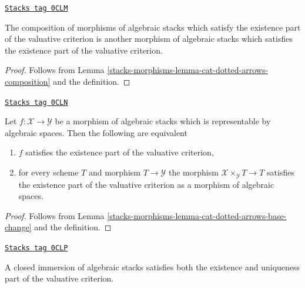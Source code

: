 \begin{lemma}
\label{stacks-morphisms-lemma-composition-existence}
\href{https://stacks.math.columbia.edu/tag/0CLM}{\texttt{Stacks tag 0CLM}}

The composition of morphisms of algebraic stacks which satisfy the
existence part of the valuative criterion is another
morphism of algebraic stacks which satisfies the
existence part of the valuative criterion.
\end{lemma}

\begin{proof}
Follows from Lemma \ref{stacks-morphisms-lemma-cat-dotted-arrows-composition}
and the definition.
\end{proof}

\begin{lemma}
\label{stacks-morphisms-lemma-existence-representable}
\href{https://stacks.math.columbia.edu/tag/0CLN}{\texttt{Stacks tag 0CLN}}

Let $f : \mathcal{X} \to \mathcal{Y}$ be a morphism of algebraic stacks
which is representable by algebraic spaces. Then the following are equivalent
\begin{enumerate}
\item $f$ satisfies the existence part of the valuative criterion,
\item for every scheme $T$ and morphism $T \to \mathcal{Y}$
the morphism $\mathcal{X} \times_\mathcal{Y} T \to T$ satisfies
the existence part of the valuative criterion as a morphism
of algebraic spaces.
\end{enumerate}
\end{lemma}

\begin{proof}
Follows from Lemma \ref{stacks-morphisms-lemma-cat-dotted-arrows-base-change}
and the definition.
\end{proof}

\begin{lemma}
\label{stacks-morphisms-lemma-closed-immersion-valuative-criteria}
\href{https://stacks.math.columbia.edu/tag/0CLP}{\texttt{Stacks tag 0CLP}}

A closed immersion of algebraic stacks satisfies both
the existence and uniqueness part of the valuative criterion.
\end{lemma}


